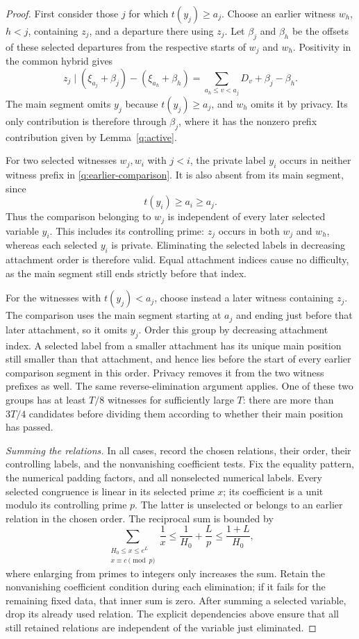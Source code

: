 \begin{proof}
First consider those $j$ for which $t(y_j)\ge a_j$.  Choose an earlier
witness $w_h$, $h<j$, containing $z_j$, and a departure there using
$z_j$.  Let $\beta_j$ and $\beta_h$ be the offsets of these selected
departures from the respective starts of $w_j$ and $w_h$.
Positivity in the common hybrid gives
\begin{equation}\label{q:earlier-comparison}
 z_j\mid(\xi_{a_j}+\beta_j)-(\xi_{a_h}+\beta_h)
      =\sum_{a_h\le v<a_j}D_v+\beta_j-\beta_h.
\end{equation}
The main segment omits $y_j$ because $t(y_j)\ge a_j$, and $w_h$ omits
it by privacy.  Its only contribution is therefore through $\beta_j$,
where it has the nonzero prefix
contribution given by Lemma~\ref{q:active}.

For two selected witnesses $w_j,w_i$ with $j<i$, the private label
$y_i$ occurs in neither witness prefix in
\eqref{q:earlier-comparison}.  It is also absent from its main segment,
since
\[
 t(y_i)\ge a_i\ge a_j.
\]
Thus the comparison belonging to $w_j$ is independent of every later
selected variable $y_i$.  This includes its controlling prime: $z_j$
occurs in both $w_j$ and $w_h$, whereas each selected $y_i$ is private.
Eliminating the selected labels in decreasing attachment order is
therefore valid.  Equal attachment indices cause no difficulty, as the
main segment still ends strictly before that index.

For the witnesses with $t(y_j)<a_j$, choose instead a later witness
containing $z_j$.  The comparison uses the main segment starting at
$a_j$ and ending just before that later attachment, so it omits $y_j$.
Order this group by decreasing attachment index.  A selected label from
a smaller attachment has its unique main position still smaller than
that attachment, and hence lies before the start of every earlier
comparison segment in this order.  Privacy removes it from the two
witness prefixes as well.  The same reverse-elimination argument applies.
One of these two groups has at least $T/8$ witnesses for sufficiently
large $T$: there are more than $3T/4$ candidates before dividing them
according to whether their main position has passed.

\emph{Summing the relations.}
In all cases, record the chosen relations, their order, their controlling
labels, and the nonvanishing coefficient tests.  Fix the equality pattern,
the numerical padding factors, and all nonselected numerical labels.
Every selected congruence is linear in its selected prime $x$; its
coefficient is a unit modulo its controlling prime $p$.  The latter is
unselected or belongs to an earlier relation in the chosen order.
The reciprocal sum is bounded by
\[
 \sum_{\substack{H_0\le x\le e^L\\x\equiv c\pmod p}}\frac1x
 \le\frac1{H_0}+\frac Lp
 \le\frac{1+L}{H_0},
\]
where enlarging from primes to integers only increases the sum.  Retain
the nonvanishing coefficient condition during each elimination; if it
fails for the remaining fixed data, that inner sum is zero.  After
summing a selected variable, drop its already used relation.  The explicit
dependencies above ensure that all still retained relations are
independent of the variable just eliminated.


\end{proof}
